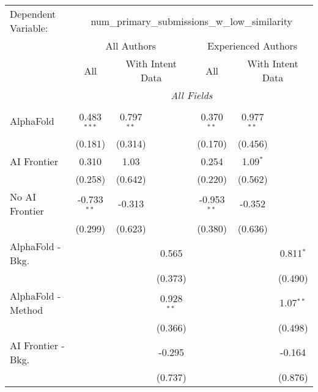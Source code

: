\begingroup
\centering
\begin{tabular}{lcccccc}
   \tabularnewline \midrule \midrule
   Dependent Variable: & \multicolumn{6}{c}{num\_primary\_submissions\_w\_low\_similarity}\\
 & \multicolumn{3}{c}{All Authors} & \multicolumn{3}{c}{Experienced Authors} \\
\cmidrule(lr){2-4} \cmidrule(lr){5-7}
 & \multicolumn{1}{c}{All} & \multicolumn{2}{c}{With Intent Data} & \multicolumn{1}{c}{All} & \multicolumn{2}{c}{With Intent Data} \\
\cmidrule(lr){2-2} \cmidrule(lr){3-4} \cmidrule(lr){5-5} \cmidrule(lr){6-7}
 & \multicolumn{6}{c}{\textit{All Fields}} \\ \\
   AlphaFold               & 0.483$^{***}$ & 0.797$^{**}$ &              & 0.370$^{**}$  & 0.977$^{**}$ &   \\   
                           & (0.181)       & (0.314)      &              & (0.170)       & (0.456)      &   \\   
   AI Frontier             & 0.310         & 1.03         &              & 0.254         & 1.09$^{*}$   &   \\   
                           & (0.258)       & (0.642)      &              & (0.220)       & (0.562)      &   \\   
   No AI Frontier          & -0.733$^{**}$ & -0.313       &              & -0.953$^{**}$ & -0.352       &   \\   
                           & (0.299)       & (0.623)      &              & (0.380)       & (0.636)      &   \\   
   AlphaFold - Bkg.        &               &              & 0.565        &               &              & 0.811$^{*}$\\   
                           &               &              & (0.373)      &               &              & (0.490)\\   
   AlphaFold - Method      &               &              & 0.928$^{**}$ &               &              & 1.07$^{**}$\\   
                           &               &              & (0.366)      &               &              & (0.498)\\   
   AI Frontier - Bkg.      &               &              & -0.295       &               &              & -0.164\\   
                           &               &              & (0.737)      &               &              & (0.876)\\   

\end{tabular}
